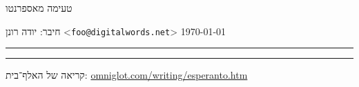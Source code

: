 



{
	\sectionfont\LARGE\color{inkC}
טעימה מאספרנטו
\hfill
{}

\normalsize
חיבר: יודה רונן <\texttt{foo@digitalwords.net}> \hfill \csdate\today

\color{inkB}
\vskip2pt\hrule\vskip2pt\hrule
}


קריאה של האלף־בית: \url{omniglot.com/writing/esperanto.htm}

\begin{center}
	\setLR
	\\
\end{center}




